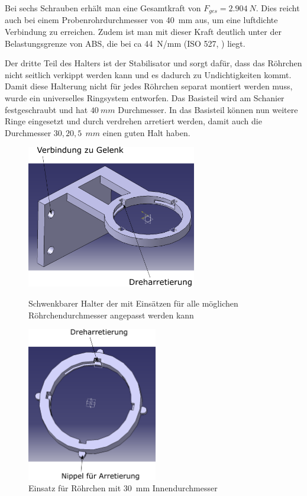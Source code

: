 Bei sechs Schrauben erhält man eine Gesamtkraft von $F_{ges} = \SI{2,904}{N}$. Dies reicht auch bei einem Probenrohrdurchmesser von \SI{40}{mm} aus, um eine luftdichte Verbindung zu erreichen. Zudem ist man mit dieser Kraft deutlich unter der Belastungsgrenze von ABS, die bei ca \SI{44}{N/mm} (ISO 527, \cite{C.Dallner2006, ThyssenPlastics}) liegt.

Der dritte Teil des Halters ist der Stabilisator und sorgt dafür, dass das Röhrchen nicht seitlich verkippt werden kann und es dadurch zu Undichtigkeiten kommt. Damit diese Halterung nicht für jedes Röhrchen separat montiert werden muss, wurde ein universelles Ringsystem entworfen. Das Basisteil wird am Schanier festgeschraubt und hat $\SI{40}{mm}$ Durchmesser. In das Basisteil können nun weitere Ringe eingesetzt und durch verdrehen arretiert werden, damit auch die Durchmesser $30,20,5\SI{}{\ mm}$ einen guten Halt haben.

	\begin{figure}[h]
		\begin{minipage}[hbt]{7.4cm}
			\centering
			\includegraphics[width=7.4cm]{Basishalter.png}
			\caption[Röhrchenhalter oben]{Schwenkbarer Halter der mit Einsätzen für alle möglichen Röhrchendurchmesser angepasst werden kann}
		\end{minipage}
		\hfill
		\begin{minipage}[hbt]{5.7cm}
			\centering
			\includegraphics[width=5.7cm]{Basishalter_Einsatz.png}
			\caption[Röhrchenhalter Einsatz oben]{Einsatz für Röhrchen mit \SI{30}{mm} Innendurchmesser}
		\end{minipage}
	\end{figure}
	
